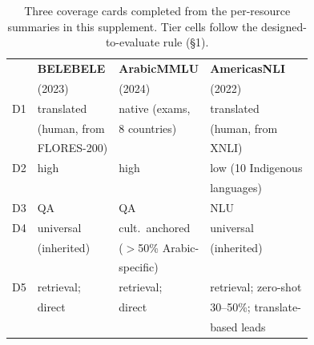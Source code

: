 \documentclass[letterpaper]{article}
\begin{document}
\begin{table}[t]
\centering
\small
\begin{tabular}{@{}llll@{}}
\toprule
 & \textbf{BELEBELE} & \textbf{ArabicMMLU} & \textbf{AmericasNLI} \\
 & (2023) & (2024) & (2022) \\
\midrule
D1 & translated & native (exams, & translated \\
 & (human, from & 8 countries) & (human, from \\
 & FLORES-200) & & XNLI) \\
D2 & high & high & low (10 Indigenous \\
 & & & languages) \\
D3 & QA & QA & NLU \\
D4 & universal & cult.\ anchored & universal \\
 & (inherited) & ($>$50\% Arabic- & (inherited) \\
 & & specific) & \\
D5 & retrieval; & retrieval; & retrieval; zero-shot \\
 & direct & direct & 30--50\%; translate- \\
 & & & based leads \\
\bottomrule
\end{tabular}
\caption{Three coverage cards completed from the per-resource summaries in this supplement. Tier cells follow the designed-to-evaluate rule (\S1).}
\label{tab:filledcards}
\end{table}
\end{document}

